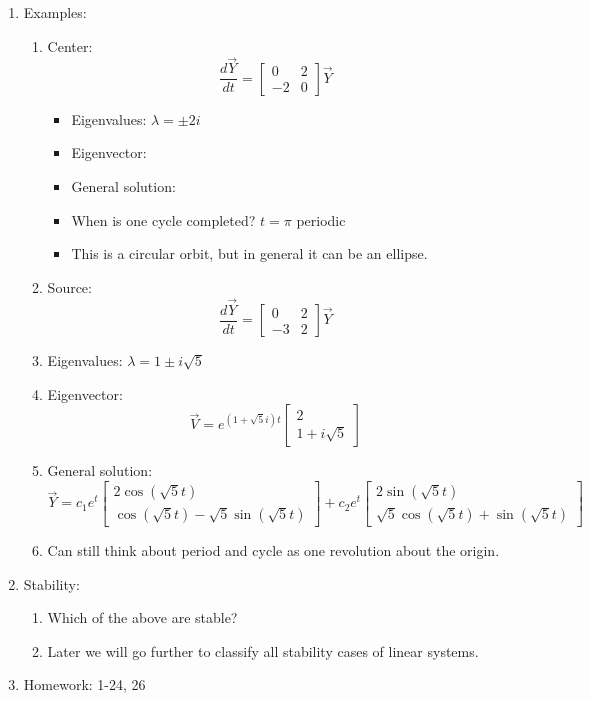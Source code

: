\documentclass{article}
\begin{document}
\begin{enumerate}
\item Examples:
\begin{enumerate}
\item Center: 
\[
\frac{d\vec{Y}}{dt} = 
\begin{bmatrix}
0 & 2 \\
-2 & 0
\end{bmatrix} \vec{Y}
\]
\begin{itemize}
\item Eigenvalues: $\lambda = \pm 2i$
\item Eigenvector: 
\item General solution:
\item When is one cycle completed? $t=\pi$ periodic
\item This is a circular orbit, but in general it can be an ellipse.
\end{itemize}
\item Source:
\[
\frac{d\vec{Y}}{dt} = 
\begin{bmatrix}
0 & 2 \\
-3 & 2
\end{bmatrix} \vec{Y}
\]
\item Eigenvalues: $\lambda = 1\pm i \sqrt{5}$
\item Eigenvector: 
\[
\vec{V} = e^{(1+\sqrt{5}i)t} \begin{bmatrix}
2 \\ 
1 + i \sqrt{5}
\end{bmatrix}
\]
\item General solution:
\[
\vec{Y} = c_1 e^t
\begin{bmatrix}
2\cos(\sqrt{5}t) \\
\cos(\sqrt{5}t)-\sqrt{5}\sin(\sqrt{5}t)
\end{bmatrix}
+
c_2 e^t
\begin{bmatrix}
2\sin(\sqrt{5}t) \\
\sqrt{5}\cos(\sqrt{5}t)+\sin(\sqrt{5}t)
\end{bmatrix}
\]
\item Can still think about period and cycle as one revolution about the origin.
\end{enumerate}


\item Stability: 
\begin{enumerate}
\item Which of the above are stable?
\item Later we will go further to classify all stability cases of linear systems.
\end{enumerate}

\item Homework: 1-24, 26

\end{enumerate}
\end{document}
